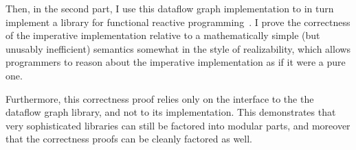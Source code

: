 Then, in the second part, I use this dataflow graph implementation to
in turn implement a library for functional reactive
programming~\cite{frp}. I prove the correctness of the imperative
implementation relative to a mathematically simple (but unusably
inefficient) semantics somewhat in the style of realizability, which
allows programmers to reason about the imperative implementation as if
it were a pure one. 

Furthermore, this correctness proof relies only on the interface to
the the dataflow graph library, and not to its implementation. This
demonstrates that very sophisticated libraries can still be factored
into modular parts, and moreover that the correctness proofs can be
cleanly factored as well. 




% 
% 
% 
% 
% 
